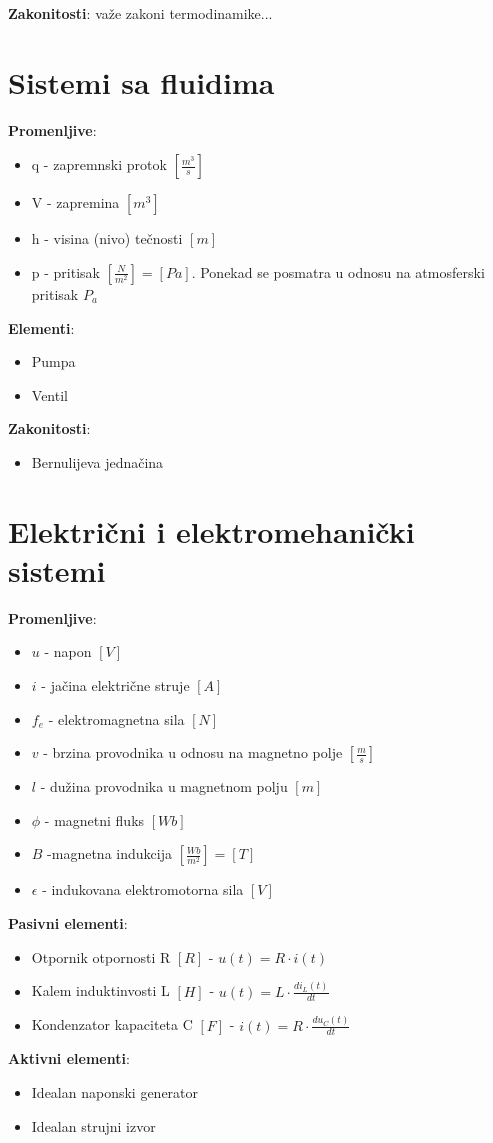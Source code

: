\documentclass[10pt]{report}
\begin{document}
		\textbf{Zakonitosti}: važe zakoni termodinamike...

	\section*{Sistemi sa fluidima}
		\textbf{Promenljive}:
		\begin{itemize}
			\item q - zapremnski protok $[\frac{m^3}{s}]$
			\item V - zapremina $[m^3]$
			\item h - visina (nivo) tečnosti $[m]$
			\item p - pritisak $[\frac{N}{m^2}] = [Pa]$. Ponekad se posmatra u odnosu na atmosferski pritisak $P_a$
		\end{itemize}

		\textbf{Elementi}:
		\begin{itemize}
			\item Pumpa
			\item Ventil
		\end{itemize}

		\textbf{Zakonitosti}:
		\begin{itemize}
			\item Bernulijeva jednačina
		\end{itemize}

	\section*{Električni i elektromehanički sistemi}
	\textbf{Promenljive}:
	\begin{itemize}
		\item $u$ - napon $[V]$
		\item $i$ - jačina električne struje $[A]$
		\item $f_e$ - elektromagnetna sila $[N]$
		\item $v$ - brzina provodnika u odnosu na magnetno polje $[\frac{m}{s}]$
		\item $l$ - dužina provodnika u magnetnom polju $[m]$
		\item $\phi$ - magnetni fluks $[Wb]$
		\item $B$ -magnetna indukcija $[\frac{Wb}{m^2}]=[T]$
		\item $\epsilon$ - indukovana elektromotorna sila $[V]$
	\end{itemize}

	\textbf{Pasivni elementi}:
	\begin{itemize}
		\item Otpornik otpornosti R $[R]$ - $u(t) = R \cdot i(t)$
		\item Kalem induktinvosti L $[H]$ - $u(t) = L \cdot \frac{di_L(t)}{dt}$
		\item Kondenzator kapaciteta C $[F]$ - $i(t) = R \cdot \frac{du_C(t)}{dt}$
	\end{itemize}
	\textbf{Aktivni elementi}:
	\begin{itemize}
		\item Idealan naponski generator
		\item Idealan strujni izvor
	\end{itemize}
\end{document}
